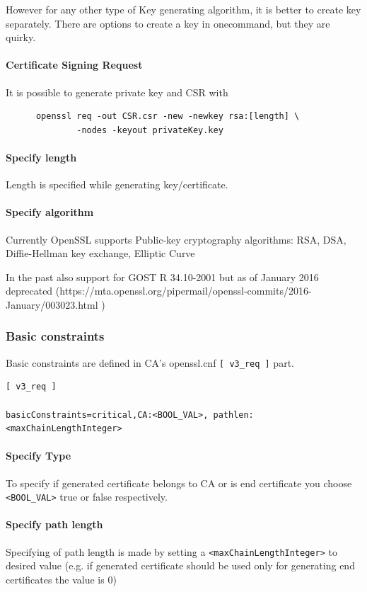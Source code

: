 \documentclass[10pt, a4paper]{report}
\begin{document}
However for any other type of Key generating algorithm, it is better to create key separately. There are options to create a key in onecommand, but they are quirky.

      \paragraph{Certificate Signing Request}
      It is possible to generate private key and CSR with
      \begin{verbatim}
      openssl req -out CSR.csr -new -newkey rsa:[length] \
              -nodes -keyout privateKey.key
      \end{verbatim}
      
      \paragraph{Specify length}
      Length is specified while generating key/certificate.
      
      \paragraph{Specify algorithm}
      Currently OpenSSL supports Public-key cryptography algorithms:
      RSA, DSA, Diffie-Hellman key exchange, Elliptic Curve
      
      In the past also support for GOST R 34.10-2001 but as of January 2016 deprecated (https://mta.openssl.org/pipermail/openssl-commits/2016-January/003023.html )
      
      
    \subsubsection{Basic constraints}
    
    Basic constraints are defined in CA's openssl.cnf \verb+[ v3_req ]+ part.
    \begin{verbatim}
[ v3_req ]

basicConstraints=critical,CA:<BOOL_VAL>, pathlen:<maxChainLengthInteger>
    \end{verbatim}

      \paragraph{Specify Type}
To specify if generated certificate belongs to CA or is end certificate you choose \verb+<BOOL_VAL>+ true or false respectively.
      \paragraph{Specify path length}
Specifying of path length is made by setting a \verb+<maxChainLengthInteger>+ to desired value (e.g. if generated certificate should be used only for generating end certificates the value is 0)
\end{document}
